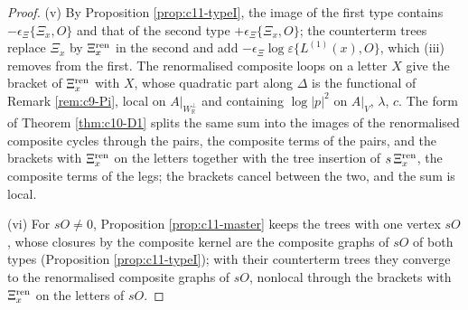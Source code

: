 \begin{proof}
(v) By Proposition \ref{prop:c11-typeI}, the image of the first type contains $-\epsilon_\Xi\{\Xi_x,O\}$ and that of the second type $+\epsilon_\Xi\{\Xi_x,O\}$; the counterterm trees replace $\Xi_x$ by $\Xi^{\rm ren}_x$ in the second and add $-\epsilon_\Xi\log\varepsilon\{L^{(1)}(x),O\}$, which (iii) removes from the first. The renormalised composite loops on a letter $X$ give the bracket of $\Xi^{\rm ren}_x$ with $X$, whose quadratic part along $\Delta$ is the functional of Remark \ref{rem:c9-Pi}, local on $A|_{W_{\mathbb R}^\perp}$ and containing $\log|p|^2$ on $A|_V$, $\lambda$, $c$. The form of Theorem \ref{thm:c10-D1} splits the same sum into the images of the renormalised composite cycles through the pairs, the composite terms of the pairs, and the brackets with $\Xi^{\rm ren}_x$ on the letters together with the tree insertion of $s\,\Xi^{\rm ren}_x$, the composite terms of the legs; the brackets cancel between the two, and the sum is local.

(vi) For $sO\neq0$, Proposition \ref{prop:c11-master} keeps the trees with one vertex $sO$, whose closures by the composite kernel are the composite graphs of $sO$ of both types (Proposition \ref{prop:c11-typeI}); with their counterterm trees they converge to the renormalised composite graphs of $sO$, nonlocal through the brackets with $\Xi^{\rm ren}_x$ on the letters of $sO$.
\end{proof}

